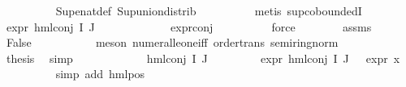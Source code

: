 \begin{isabellebody}
\ \ \ \ \ \ \ \ \isamarkupfalse%
\ Sup{\isacharunderscore}{\kern0pt}enat{\isacharunderscore}{\kern0pt}def\ Sup{\isacharunderscore}{\kern0pt}union{\isacharunderscore}{\kern0pt}distrib\isanewline
\ \ \ \ \ \ \ \ \isamarkupfalse%
\ {\isacharparenleft}{\kern0pt}metis\ sup{\isachardot}{\kern0pt}coboundedI{}{\isacharparenright}{\kern0pt}\isanewline
\ \ \ \ \ \ \isamarkupfalse%
\ {\isachardoublequoteopen}expr{\isacharunderscore}{\kern0pt}{}\ {\isacharparenleft}{\kern0pt}hml{\isacharunderscore}{\kern0pt}conj\ I\ J\ {\isasymPhi}{\isacharparenright}{\kern0pt}\ {\isasymge}\ {}{\isachardoublequoteclose}\isanewline
\ \ \ \ \ \ \ \ \isamarkupfalse%
\ expr{\isacharunderscore}{\kern0pt}{}{\isacharunderscore}{\kern0pt}conj\isanewline
\ \ \ \ \ \ \ \ \isamarkupfalse%
\ force\isanewline
\ \ \ \ \ \ \isamarkupfalse%
\ assms{\isacharparenleft}{\kern0pt}{}{\isacharparenright}{\kern0pt}\ \isamarkupfalse%
\ False\ \isanewline
\ \ \ \ \ \ \ \ \isamarkupfalse%
\ {\isacharparenleft}{\kern0pt}meson\ numeral{\isacharunderscore}{\kern0pt}le{\isacharunderscore}{\kern0pt}one{\isacharunderscore}{\kern0pt}iff\ order{\isacharunderscore}{\kern0pt}trans\ semiring{\isacharunderscore}{\kern0pt}norm{\isacharparenleft}{\kern0pt}{}{}{\isacharparenright}{\kern0pt}{\isacharparenright}{\kern0pt}\isanewline
\ \ \ \ \ \ \isamarkupfalse%
\ \isamarkupfalse%
\ {\isacharquery}{\kern0pt}thesis\ \isamarkupfalse%
\ simp\isanewline
\ \ \ \ \isamarkupfalse%
\isanewline
\ \ \ \ \ \ \isamarkupfalse%
\ {\isacharparenleft}{\kern0pt}hml{\isacharunderscore}{\kern0pt}conj\ I{\isacharprime}{\kern0pt}\ J{\isacharprime}{\kern0pt}\ {\isasymPhi}{\isacharprime}{\kern0pt}{\isacharparenright}{\kern0pt}\isanewline
\ \ \ \ \ \ \isamarkupfalse%
\ {\isachardoublequoteopen}expr{\isacharunderscore}{\kern0pt}{}\ {\isacharparenleft}{\kern0pt}hml{\isacharunderscore}{\kern0pt}conj\ I{\isacharprime}{\kern0pt}\ J{\isacharprime}{\kern0pt}\ {\isasymPhi}{\isacharprime}{\kern0pt}{\isacharparenright}{\kern0pt}\ {\isacharequal}{\kern0pt}\ expr{\isacharunderscore}{\kern0pt}{}\ x{\isachardoublequoteclose}\isanewline
\ \ \ \ \ \ \ \ \isamarkupfalse%
\ {\isacharparenleft}{\kern0pt}simp\ add{\isacharcolon}{\kern0pt}\ hml{\isacharunderscore}{\kern0pt}pos{\isacharparenright}{\kern0pt}\isanewline
\ \ \ \ \ \ \isamarkupfalse%

\end{isabellebody}
